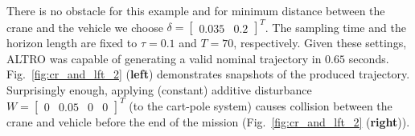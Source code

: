There is no obstacle for this example and for minimum distance between the crane and the vehicle we choose $\delta=\begin{bmatrix}0.035&0.2\end{bmatrix}^T$. The sampling time and the horizon length are fixed to $\tau=0.1$ and $T=70$, respectively. Given these settings, ALTRO was capable of generating a valid nominal trajectory in $0.65$ seconds. Fig.~\ref{fig:cr_and_lft_2} (\textbf{left}) demonstrates snapshots of the produced trajectory. Surprisingly enough, applying (constant) additive disturbance $W=\begin{bmatrix}0&0.05&0&0\end{bmatrix}^T$ (to the cart-pole system) causes collision between the crane and vehicle before the end of the mission (Fig.~\ref{fig:cr_and_lft_2} (\textbf{right})).

